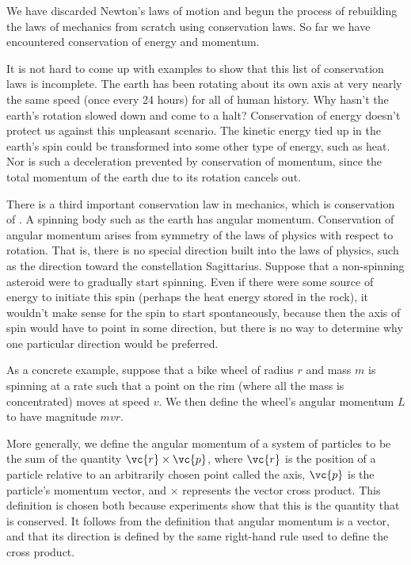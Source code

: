 We have discarded Newton's laws of motion and begun the process of
rebuilding the laws of mechanics from scratch using conservation laws.
So far we have encountered conservation of energy and momentum.

It is not hard to come up with examples to show that this list of
conservation laws is incomplete. The earth has been
rotating about its own axis
at very nearly the same speed (once every 24 hours) for all of human history.
Why hasn't the earth's rotation slowed down and come to a halt? Conservation of energy doesn't
protect us against this unpleasant scenario. 
The kinetic energy tied up in the earth's spin could be transformed into some
other type of energy, such as heat. Nor is such a deceleration prevented by
conservation of momentum, since the total momentum of the earth due to its
rotation cancels out.

There is a third important conservation law in mechanics, which is conservation of
. 
A spinning body such as the earth has angular momentum. Conservation of angular
momentum arises from symmetry of the laws of physics with respect to rotation.
That is, there is no special direction built into the laws of physics, such as the
direction toward the constellation Sagittarius. Suppose that a non-spinning asteroid
were to gradually start spinning. Even if there were some source of energy to initiate
this spin (perhaps the heat energy stored in the rock), it wouldn't make sense for
the spin to start spontaneously, because then the axis of spin would have to point
in some direction, but there is no way to determine why one particular direction
would be preferred.

As a concrete example, suppose that a bike wheel of radius $r$ and mass $m$ is
spinning at a rate such that a point on the rim (where all the mass is concentrated)
moves at speed $v$. We then define the wheel's angular momentum $L$ to have magnitude
$mvr$.

More generally, we define the angular momentum of a system of particles to
be the sum of the quantity $\vc{r}\times\vc{p}$, where $\vc{r}$ is the position of
a particle relative to an arbitrarily chosen point called the axis, $\vc{p}$ is the
particle's momentum vector, and $\times$ represents the vector cross product. This
definition is chosen both because experiments show that this is the quantity that is
conserved. It
follows from the definition that angular momentum is a vector, and that its direction
is defined by the same right-hand rule used to define the cross product.
